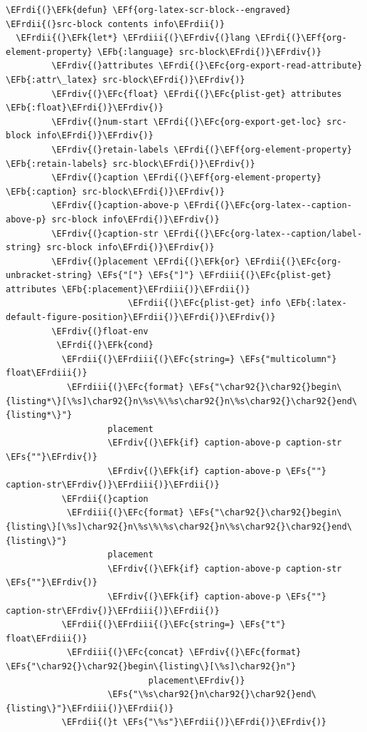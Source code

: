 \documentclass{scrartcl}
\newcommand{\EFk}[1]{\textcolor{EFk}{#1}} %
\newcommand{\EFs}[1]{\textcolor{EFs}{#1}} %
\newcommand{\EFb}[1]{\textcolor{EFb}{#1}} %
\newcommand{\EFc}[1]{\textcolor{EFc}{#1}} %
\newcommand{\EFf}[1]{\textcolor{EFf}{#1}} %
\newcommand{\EFrdi}[1]{\textcolor{EFrdi}{#1}} %
\newcommand{\EFrdii}[1]{\textcolor{EFrdii}{#1}} %
\newcommand{\EFrdiii}[1]{\textcolor{EFrdiii}{#1}} %
\newcommand{\EFrdiv}[1]{\textcolor{EFrdiv}{#1}} %
\begin{document}
\begin{Code}
\begin{Verbatim}[]
\EFrdi{(}\EFk{defun} \EFf{org-latex-scr-block--engraved} \EFrdii{(}src-block contents info\EFrdii{)}
  \EFrdii{(}\EFk{let*} \EFrdiii{(}\EFrdiv{(}lang \EFrdi{(}\EFf{org-element-property} \EFb{:language} src-block\EFrdi{)}\EFrdiv{)}
         \EFrdiv{(}attributes \EFrdi{(}\EFc{org-export-read-attribute} \EFb{:attr\_latex} src-block\EFrdi{)}\EFrdiv{)}
         \EFrdiv{(}\EFc{float} \EFrdi{(}\EFc{plist-get} attributes \EFb{:float}\EFrdi{)}\EFrdiv{)}
         \EFrdiv{(}num-start \EFrdi{(}\EFc{org-export-get-loc} src-block info\EFrdi{)}\EFrdiv{)}
         \EFrdiv{(}retain-labels \EFrdi{(}\EFf{org-element-property} \EFb{:retain-labels} src-block\EFrdi{)}\EFrdiv{)}
         \EFrdiv{(}caption \EFrdi{(}\EFf{org-element-property} \EFb{:caption} src-block\EFrdi{)}\EFrdiv{)}
         \EFrdiv{(}caption-above-p \EFrdi{(}\EFc{org-latex--caption-above-p} src-block info\EFrdi{)}\EFrdiv{)}
         \EFrdiv{(}caption-str \EFrdi{(}\EFc{org-latex--caption/label-string} src-block info\EFrdi{)}\EFrdiv{)}
         \EFrdiv{(}placement \EFrdi{(}\EFk{or} \EFrdii{(}\EFc{org-unbracket-string} \EFs{"["} \EFs{"]"} \EFrdiii{(}\EFc{plist-get} attributes \EFb{:placement}\EFrdiii{)}\EFrdii{)}
                        \EFrdii{(}\EFc{plist-get} info \EFb{:latex-default-figure-position}\EFrdii{)}\EFrdi{)}\EFrdiv{)}
         \EFrdiv{(}float-env
          \EFrdi{(}\EFk{cond}
           \EFrdii{(}\EFrdiii{(}\EFc{string=} \EFs{"multicolumn"} float\EFrdiii{)}
            \EFrdiii{(}\EFc{format} \EFs{"\char92{}\char92{}begin\{listing*\}[\%s]\char92{}n\%s\%\%s\char92{}n\%s\char92{}\char92{}end\{listing*\}"}
                    placement
                    \EFrdiv{(}\EFk{if} caption-above-p caption-str \EFs{""}\EFrdiv{)}
                    \EFrdiv{(}\EFk{if} caption-above-p \EFs{""} caption-str\EFrdiv{)}\EFrdiii{)}\EFrdii{)}
           \EFrdii{(}caption
            \EFrdiii{(}\EFc{format} \EFs{"\char92{}\char92{}begin\{listing\}[\%s]\char92{}n\%s\%\%s\char92{}n\%s\char92{}\char92{}end\{listing\}"}
                    placement
                    \EFrdiv{(}\EFk{if} caption-above-p caption-str \EFs{""}\EFrdiv{)}
                    \EFrdiv{(}\EFk{if} caption-above-p \EFs{""} caption-str\EFrdiv{)}\EFrdiii{)}\EFrdii{)}
           \EFrdii{(}\EFrdiii{(}\EFc{string=} \EFs{"t"} float\EFrdiii{)}
            \EFrdiii{(}\EFc{concat} \EFrdiv{(}\EFc{format} \EFs{"\char92{}\char92{}begin\{listing\}[\%s]\char92{}n"}
                            placement\EFrdiv{)}
                    \EFs{"\%s\char92{}n\char92{}\char92{}end\{listing\}"}\EFrdiii{)}\EFrdii{)}
           \EFrdii{(}t \EFs{"\%s"}\EFrdii{)}\EFrdi{)}\EFrdiv{)}

\end{Verbatim}
\end{Code}
\end{document}
